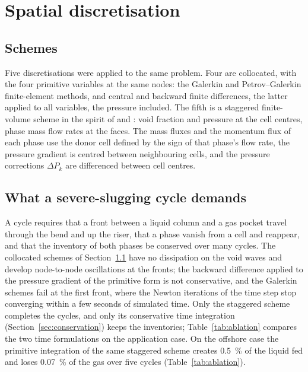 \documentclass[a4paper,fleqn]{cas-sc}
\begin{document}
\begin{table}[htbp]
\caption{Ill-posed fraction of the cell--time states of a severe-slugging simulation, by dominant flow pattern, with the regularisation of the model and with the low-void rule or the virtual mass removed a posteriori on the same states.}\label{tab:trajectory}
\footnotesize


\end{table}

\section{Spatial discretisation}\label{sec:space}

\subsection{Schemes}\label{sec:schemes}

Five discretisations were applied to the same problem. Four are collocated, with the four primitive variables at the same nodes: the Galerkin and Petrov--Galerkin finite-element methods, and central and backward finite differences, the latter applied to all variables, the pressure included. The fifth is a staggered finite-volume scheme in the spirit of \citet{harlow1965} and \citet{patankar1980}: void fraction and pressure at the cell centres, phase mass flow rates at the faces. The mass fluxes and the momentum flux of each phase use the donor cell defined by the sign of that phase's flow rate, the pressure gradient is centred between neighbouring cells, and the pressure corrections $\Delta P_k$ are differenced between cell centres.

\subsection{What a severe-slugging cycle demands}\label{sec:demands}

A cycle requires that a front between a liquid column and a gas pocket travel through the bend and up the riser, that a phase vanish from a cell and reappear, and that the inventory of both phases be conserved over many cycles. The collocated schemes of Section~\ref{sec:schemes} have no dissipation on the void waves and develop node-to-node oscillations at the fronts; the backward difference applied to the pressure gradient of the primitive form is not conservative, and the Galerkin schemes fail at the first front, where the Newton iterations of the time step stop converging within a few seconds of simulated time. Only the staggered scheme completes the cycles, and only its conservative time integration (Section~\ref{sec:conservation}) keeps the inventories; Table~\ref{tab:ablation} compares the two time formulations on the application case. On the offshore case the primitive integration of the same staggered scheme creates \SI{0.5}{\percent} of the liquid fed and loses \SI{0.07}{\percent} of the gas over five cycles (Table~\ref{tab:ablation}).
\end{document}
